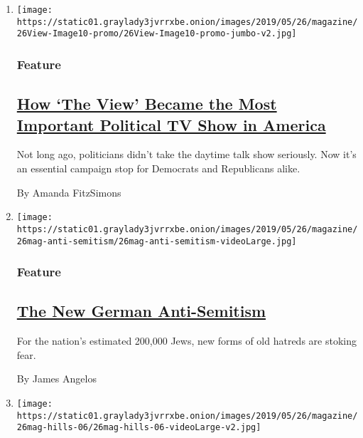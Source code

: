 \begin{enumerate}
\def\labelenumi{\arabic{enumi}.}
\item
  \texttt{[image: https://static01.graylady3jvrrxbe.onion/images/2019/05/26/magazine/26View-Image10-promo/26View-Image10-promo-jumbo-v2.jpg]}

  \hypertarget{feature}{%
  \subsubsection{Feature}\label{feature}}

  \hypertarget{how-the-view-became-the-most-important-political-tv-show-in-america}{%
  \subsection{\texorpdfstring{\href{/2019/05/22/magazine/the-view-politics-tv.html}{How
  `The View' Became the Most Important Political TV Show in
  America}}{How `The View' Became the Most Important Political TV Show in America}}\label{how-the-view-became-the-most-important-political-tv-show-in-america}}

  Not long ago, politicians didn't take the daytime talk show seriously.
  Now it's an essential campaign stop for Democrats and Republicans
  alike.

  By Amanda FitzSimons
\item
  \texttt{[image: https://static01.graylady3jvrrxbe.onion/images/2019/05/26/magazine/26mag-anti-semitism/26mag-anti-semitism-videoLarge.jpg]}

  \hypertarget{feature-1}{%
  \subsubsection{Feature}\label{feature-1}}

  \hypertarget{the-new-german-anti-semitism}{%
  \subsection{\texorpdfstring{\href{/2019/05/21/magazine/anti-semitism-germany.html}{The
  New German
  Anti-Semitism}}{The New German Anti-Semitism}}\label{the-new-german-anti-semitism}}

  For the nation's estimated 200,000 Jews, new forms of old hatreds are
  stoking fear.

  By James Angelos
\item
  \texttt{[image: https://static01.graylady3jvrrxbe.onion/images/2019/05/26/magazine/26mag-hills-06/26mag-hills-06-videoLarge-v2.jpg]}


\end{enumerate}

